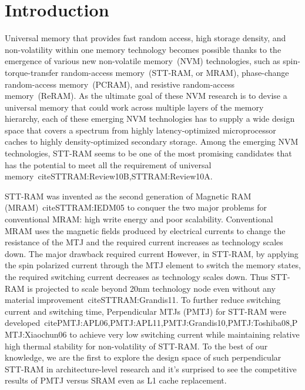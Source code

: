 \section{Introduction} \label{sec:intro}

Universal memory that provides fast random access, high storage density, and non-volatility within one memory technology becomes possible thanks to the emergence of various new non-volatile memory~(NVM) technologies, such as spin-torque-transfer random-access memory~(STT-RAM, or MRAM), phase-change random-access memory~(PCRAM), and resistive random-access memory~(ReRAM). As the ultimate
goal of these NVM research is to devise a universal memory that could work across multiple layers of the memory hierarchy, each of these emerging NVM technologies has to supply a wide design space that covers a spectrum from highly latency-optimized microprocessor caches to highly density-optimized secondary storage. Among the emerging NVM technologies, STT-RAM seems to be one of the most promising candidates that has the potential to meet all the requirement of universal memory~cite{STTRAM:Review10B,STTRAM:Review10A}. 

STT-RAM was invented as the second generation of Magnetic RAM (MRAM)~cite{STTRAM:IEDM05} to conquer the two major problems for conventional MRAM: high write energy and poor scalability. Conventional MRAM uses the magnetic fields produced by electrical currents
to change the resistance of the MTJ and the required current increases as technology scales down. The major drawback required current However, in STT-RAM, by applying the spin polarized current through the MTJ element to switch the memory states, the required switching current decreases as technology scales down. Thus STT-RAM is projected to scale beyond 20nm technology node even without any material improvement~cite{STTRAM:Grandis11}. To further reduce switching current and switching time, Perpendicular MTJs (PMTJ) for STT-RAM were developed~cite{PMTJ:APL06,PMTJ:APL11,PMTJ:Grandis10,PMTJ:Toshiba08,PMTJ:Xiaochun06} to achieve very low switching current while maintaining relative high thermal stability for non-volatility of STT-RAM. To the best of our knowledge, we are the first to explore the design space of such perpendicular STT-RAM in architecture-level research and it's surprised to see the competitive results of PMTJ versus SRAM even as L1 cache replacement. 

